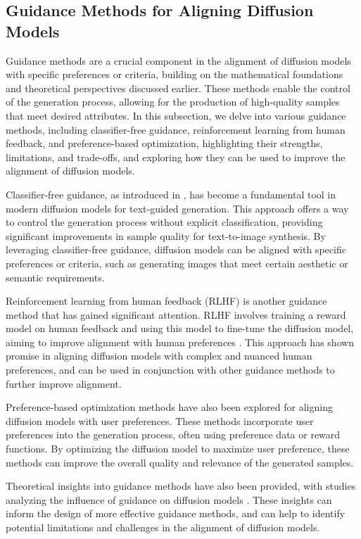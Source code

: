 \documentclass[11pt,a4paper]{article}
\begin{document}
\subsection{Guidance Methods for Aligning Diffusion Models}


Guidance methods are a crucial component in the alignment of diffusion models with specific preferences or criteria, building on the mathematical foundations and theoretical perspectives discussed earlier. These methods enable the control of the generation process, allowing for the production of high-quality samples that meet desired attributes. In this subsection, we delve into various guidance methods, including classifier-free guidance, reinforcement learning from human feedback, and preference-based optimization, highlighting their strengths, limitations, and trade-offs, and exploring how they can be used to improve the alignment of diffusion models.

Classifier-free guidance, as introduced in \cite{arxiv:2102.09672}, has become a fundamental tool in modern diffusion models for text-guided generation. This approach offers a way to control the generation process without explicit classification, providing significant improvements in sample quality for text-to-image synthesis. By leveraging classifier-free guidance, diffusion models can be aligned with specific preferences or criteria, such as generating images that meet certain aesthetic or semantic requirements.

Reinforcement learning from human feedback (RLHF) is another guidance method that has gained significant attention. RLHF involves training a reward model on human feedback and using this model to fine-tune the diffusion model, aiming to improve alignment with human preferences \cite{arxiv:2305.13301}. This approach has shown promise in aligning diffusion models with complex and nuanced human preferences, and can be used in conjunction with other guidance methods to further improve alignment.

Preference-based optimization methods have also been explored for aligning diffusion models with user preferences. These methods incorporate user preferences into the generation process, often using preference data or reward functions. By optimizing the diffusion model to maximize user preference, these methods can improve the overall quality and relevance of the generated samples.

Theoretical insights into guidance methods have also been provided, with studies analyzing the influence of guidance on diffusion models \cite{arxiv:2403.01639}. These insights can inform the design of more effective guidance methods, and can help to identify potential limitations and challenges in the alignment of diffusion models.
\end{document}
